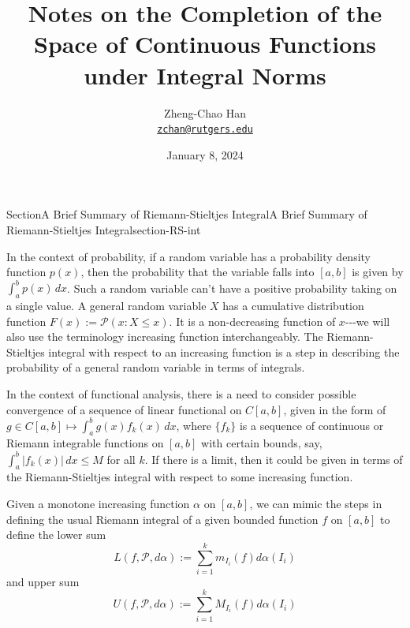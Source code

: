 \documentclass[oneside,10pt,]{article}
\title{Notes on the Completion of the Space of Continuous Functions under Integral Norms}
\author{Zheng-Chao Han\\
\href{mailto:zchan@rutgers.edu}{\nolinkurl{zchan@rutgers.edu}}
}
\date{January 8, 2024}
\numberwithin{equation}{section}
\newcommand{\cP}{\mathcal{P}}
\begin{document}
\raggedbottom
\hypertarget{article-Notes412Integral}{}
\maketitle
\thispagestyle{empty}
%
%
\typeout{************************************************}
\typeout{************************************************}
%
\begin{sectionptx}{Section}{A Brief Summary of Riemann-Stieltjes Integral}{}{A Brief Summary of Riemann-Stieltjes Integral}{}{}{section-RS-int}
\begin{introduction}{}%
In the context of probability, if a random variable has a probability density function \(p(x)\), then the probability that the variable falls into \([a, b]\) is given by \(\int_{a}^{b} p(x)\, dx\). Such a random variable can't have a positive probability taking on a single value. A general random variable \(X\) has a cumulative distribution	function \(F(x) :=\cP(x: X\le x)\). It is a non-decreasing function of \(x\)-{}-{}-we will also use the terminology increasing function interchangeably. The Riemann-Stieltjes integral with respect to an increasing function is a step in describing the probability of a general random variable in terms of integrals.%
\par
In the context of functional analysis, there is a need to consider possible convergence of a sequence of linear functional on \(C[a, b]\), given in the form of \(g\in C[a, b]\mapsto \int_{a}^{b} g(x)f_{k}(x)\, dx\), where \(\{f_{k}\}\) is a sequence of continuous or Riemann integrable functions on \([a, b]\) with certain bounds, say, \(\int_{a}^{b} |f_{k}(x)|\, dx\le M\) for all \(k\). If there is a limit, then it could be given in terms of the Riemann-Stieltjes integral with respect to some increasing function.%
\end{introduction}%
Given a monotone increasing function \(\alpha\) on \([a, b]\), we can mimic the steps in defining the usual Riemann integral of a given bounded function \(f\) on \([a, b]\) to define the lower sum%
\begin{equation*}
L(f, \cP, d \alpha)  :=\sum_{i=1}^{k} m_{I_{i}} (f) d\alpha(I_{i})
\end{equation*}
and upper sum%
\begin{equation*}
U(f, \cP, d \alpha)  :=\sum_{i=1}^{k} M_{I_{i}} (f) d\alpha (I_{i})

\end{equation*}
\end{sectionptx}
\end{document}
